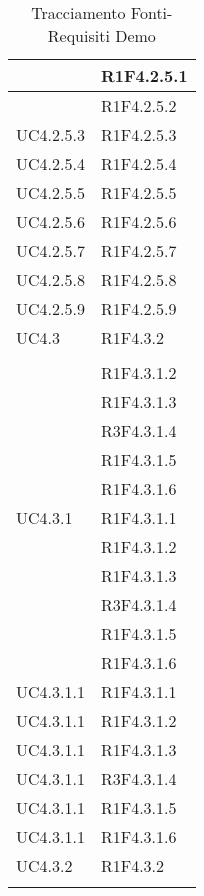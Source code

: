 \begin{longtable}{|>{\centering}m{5cm}|m{5cm}<{\centering}|}
{UC4.2.5.1}&{R1F4.2.5.1}\\ \hline
{UC4.2.5.2}&{R1F4.2.5.2}\\ \hline
{UC4.2.5.3}&{R1F4.2.5.3}\\ \hline
{UC4.2.5.4}&{R1F4.2.5.4}\\ \hline
{UC4.2.5.5}&{R1F4.2.5.5}\\ \hline
{UC4.2.5.6}&{R1F4.2.5.6}\\ \hline
{UC4.2.5.7}&{R1F4.2.5.7}\\ \hline
{UC4.2.5.8}&{R1F4.2.5.8}\\ \hline
{UC4.2.5.9}&{R1F4.2.5.9}\\ \hline

{UC4.3}&{R1F4.3.2}\\
{R1F4.3.1.1}\\
&{R1F4.3.1.2}\\
&{R1F4.3.1.3}\\
&{R3F4.3.1.4}\\
&{R1F4.3.1.5}\\
&{R1F4.3.1.6}\\ \hline
{UC4.3.1}&{R1F4.3.1.1}\\
&{R1F4.3.1.2}\\
&{R1F4.3.1.3}\\
&{R3F4.3.1.4}\\
&{R1F4.3.1.5}\\
&{R1F4.3.1.6}\\ \hline
{UC4.3.1.1}&{R1F4.3.1.1}\\ \hline
{UC4.3.1.1}&{R1F4.3.1.2}\\ \hline
{UC4.3.1.1}&{R1F4.3.1.3}\\ \hline
{UC4.3.1.1}&{R3F4.3.1.4}\\ \hline
{UC4.3.1.1}&{R1F4.3.1.5}\\ \hline
{UC4.3.1.1}&{R1F4.3.1.6}\\ \hline
{UC4.3.2}&{R1F4.3.2}\\ \hline

\caption[Tracciamento Fonti-Requisiti Demo]{Tracciamento Fonti-Requisiti Demo}
\label{tabella: Tracciamento Fonti-Requisiti Demo}
\end{longtable}
\newpage
